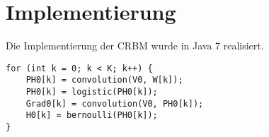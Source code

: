 \section{Implementierung}\label{implementation}
Die Implementierung der CRBM wurde in Java 7 realisiert.
\newline
\newline 
\begin{lstlisting}[caption="TextTextText"]
for (int k = 0; k < K; k++) {
	PH0[k] = convolution(V0, W[k]);
	PH0[k] = logistic(PH0[k]);
	Grad0[k] = convolution(V0, PH0[k]);
	H0[k] = bernoulli(PH0[k]);
}
\end{lstlisting}